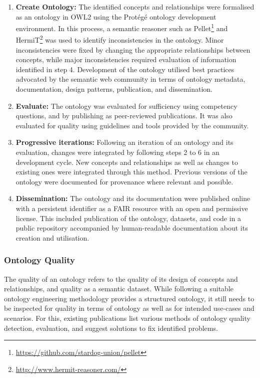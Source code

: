 \begin{enumerate}
    \item \textbf{Create Ontology:} The identified concepts and relationships were formalised as an ontology in OWL2 using the Protégé ontology development environment. In this process, a semantic reasoner such as Pellet\footnote{\url{https://github.com/stardog-union/pellet}} and HermiT\footnote{\url{http://www.hermit-reasoner.com/}} was used to identify inconsistencies in the ontology. Minor inconsistencies were fixed by changing the appropriate relationships between concepts, while major inconsistencies required evaluation of information identified in step 4. Development of the ontology utilised best practices advocated by the semantic web community in terms of ontology metadata, documentation, design patterns, publication, and dissemination.
    \item \textbf{Evaluate:} The ontology was evaluated for sufficiency using competency questions, and by publishing as peer-reviewed publications. It was also evaluated for quality using guidelines and tools provided by the community.
    \item \textbf{Progressive iterations:} Following an iteration of an ontology and its evaluation, changes were integrated by following steps 2 to 6 in an development cycle. New concepts and relationships as well as changes to existing ones were integrated through this method. Previous versions of the ontology were documented for provenance where relevant and possible.
    \item \textbf{Dissemination:} The ontology and its documentation were published online with a persistent identifier as a FAIR resource with an open and permissive license. This included publication of the ontology, datasets, and code in a public repository accompanied by human-readable documentation about its creation and utilisation.
\end{enumerate}

\subsubsection*{Ontology Quality}
The quality of an ontology refers to the quality of its design of concepts and relationships, and quality as a semantic dataset. While following a suitable ontology engineering methodology provides a structured ontology, it still needs to be inspected for quality in terms of ontology as well as for intended use-cases and scenarios. For this, existing publications \cite{gurk_towards_2017,vrandecic_ontology_2010} list various methods of ontology quality detection, evaluation, and suggest solutions to fix identified problems.

